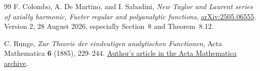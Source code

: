 \documentclass[11pt,a4paper]{article}
\numberwithin{equation}{section}
\theoremstyle{definition}
\theoremstyle{remark}
\begin{document}
\begin{thebibliography}{99}
F. Colombo, A. De Martino, and I. Sabadini,
\emph{New Taylor and Laurent series of axially harmonic, Fueter regular
and polyanalytic functions},
\href{https://arxiv.org/abs/2505.06555}{arXiv:2505.06555}.
Version 2, 28 August 2026, especially Section~8 and Theorem~8.12.

C. Runge,
\emph{Zur Theorie der eindeutigen analytischen Functionen},
Acta Mathematica \textbf{6} (1885), 229--244.
\href{https://archive.ymsc.tsinghua.edu.cn/pacm_paperurl/20170108202936251283802}
{Author's article in the Acta Mathematica archive}.
\end{thebibliography}
\endgroup
\end{document}
